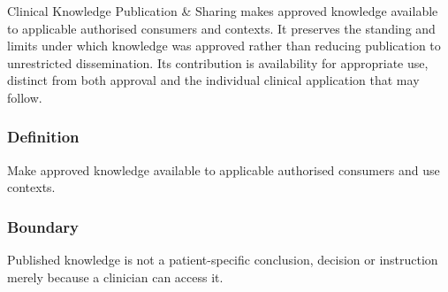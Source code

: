 Clinical Knowledge Publication \& Sharing makes approved knowledge available to applicable authorised consumers and contexts. It preserves the standing and limits under which knowledge was approved rather than reducing publication to unrestricted dissemination. Its contribution is availability for appropriate use, distinct from both approval and the individual clinical application that may follow.

\subsubsection*{Definition}

Make approved knowledge available to applicable authorised consumers and use contexts.

\subsubsection*{Boundary}

Published knowledge is not a patient-specific conclusion, decision or instruction merely because a clinician can access it.


